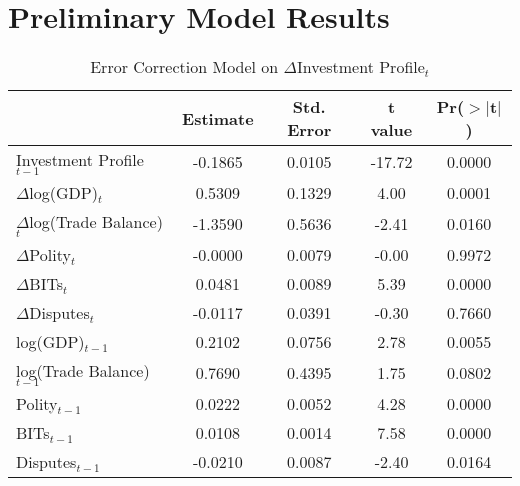\section{Preliminary Model Results}
\begin{table}[ht]
\centering
\label{tab:invprofile}
\caption{Error Correction Model on $\Delta$Investment Profile$_{t}$}
\begin{tabular}{lcccc}
  \hline\hline
 & Estimate & Std. Error & t value & Pr($>$$|$t$|$) \\ 
  \hline
Investment Profile$_{t-1}$ & -0.1865 & 0.0105 & -17.72 & 0.0000 \\ 
\hline
  $\Delta$log(GDP)$_{t}$ & 0.5309 & 0.1329 & 4.00 & 0.0001 \\ 
  $\Delta$log(Trade Balance)$_{t}$ & -1.3590 & 0.5636 & -2.41 & 0.0160 \\ 
  $\Delta$Polity$_{t}$ & -0.0000 & 0.0079 & -0.00 & 0.9972 \\ 
  $\Delta$BITs$_{t}$ & 0.0481 & 0.0089 & 5.39 & 0.0000 \\ 
  $\Delta$Disputes$_{t}$ & -0.0117 & 0.0391 & -0.30 & 0.7660 \\ 
  \hline
  log(GDP)$_{t-1}$ & 0.2102 & 0.0756 & 2.78 & 0.0055 \\ 
  log(Trade Balance)$_{t-1}$ & 0.7690 & 0.4395 & 1.75 & 0.0802 \\ 
  Polity$_{t-1}$ & 0.0222 & 0.0052 & 4.28 & 0.0000 \\ 
  BITs$_{t-1}$ & 0.0108 & 0.0014 & 7.58 & 0.0000 \\ 
  Disputes$_{t-1}$ & -0.0210 & 0.0087 & -2.40 & 0.0164 \\ 
   \hline\hline
\end{tabular}
\end{table}



